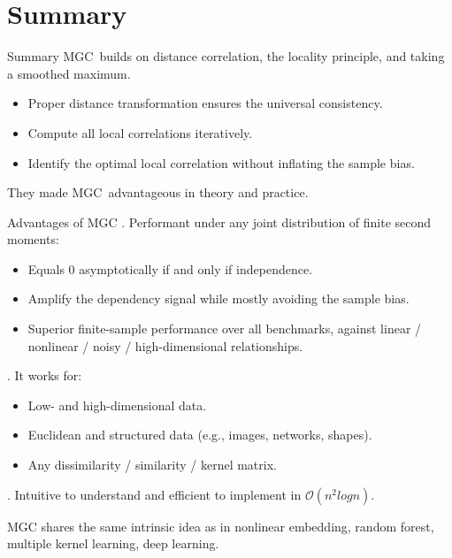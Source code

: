 \documentclass[mathserif,t]{beamer}
\newcommand{\Mgc}{MGC}
\begin{document}
\section{Summary}
\begin{frame}{Summary}
\pause
\Mgc~builds on distance correlation, the locality principle, and taking a smoothed maximum.

\pause
\medskip
\begin{itemize}[<+->]
\item Proper distance transformation ensures the universal consistency.
\item Compute all local correlations iteratively.
\item Identify the optimal local correlation without inflating the sample bias.
\end{itemize}
\pause
\medskip
They made \Mgc~advantageous in theory and practice.\\
\end{frame}

\begin{frame}{Advantages of \Mgc}
. Performant under any joint distribution of finite second moments:
\pause
\begin{itemize}[<+->]
\item Equals $0$ asymptotically if and only if independence.
\item \textcolor{UniOrange}{Amplify the dependency signal while mostly avoiding the sample bias.} 
\item Superior finite-sample performance over all benchmarks, against linear / nonlinear / noisy / high-dimensional relationships. 
\end{itemize}

\pause
{}. It works for:
\pause
\begin{itemize}[<+->]
\item Low- and high-dimensional data.
\item Euclidean and structured data (e.g., images, networks, shapes).
\item Any dissimilarity / similarity / kernel matrix.
\end{itemize}

\pause
{}. Intuitive to understand and efficient to implement in $\mathcal{O}(n^2 log n)$.

\pause
\medskip
MGC shares the same intrinsic idea as in nonlinear embedding, random forest, multiple kernel learning, deep learning.
\end{frame}
\end{document}
